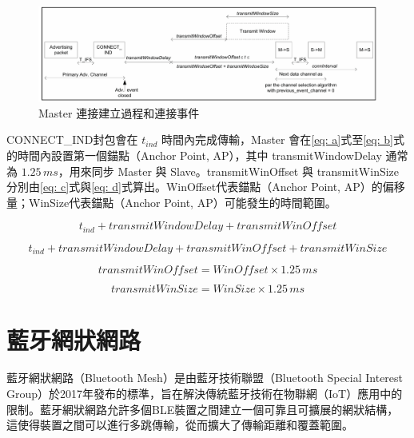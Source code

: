 \begin{ZhChapter}
\begin{figure}[H]
    \centering
    \includegraphics[width = 1\textwidth]{image/Master 連接建立過程和連接事件.png}
    \caption{Master 連接建立過程和連接事件\cite{bluetooth2016core}}
    \label{fig: Master 連接建立過程和連接事件}
\end{figure}

CONNECT\_IND封包會在 $t_{ind}$ 時間內完成傳輸，Master 會在\ref{eq: a}式至\ref{eq: b}式的時間內設置第一個錨點（Anchor Point, AP），其中 transmitWindowDelay 通常為 $1.25\,{ms}$，用來同步 Master 與 Slave。transmitWinOffset 與 transmitWinSize 分別由\ref{eq: c}式與\ref{eq: d}式算出。WinOffset代表錨點（Anchor Point, AP）的偏移量；WinSize代表錨點（Anchor Point, AP）可能發生的時間範圍\cite{10.1145/3412382.3458271}。

\begin{equation}
t_{ind} + transmitWindowDelay + transmitWinOffset
\label{eq: a}
\end{equation}

\begin{equation}
t_{ind} + transmitWindowDelay + transmitWinOffset + transmitWinSize
\label{eq: b}
\end{equation}

\begin{equation}
transmitWinOffset = WinOffset \times 1.25\, ms
\label{eq: c}
\end{equation}

\begin{equation}
transmitWinSize = WinSize \times 1.25\, ms 
\label{eq: d}
\end{equation}

\section{藍牙網狀網路}

藍牙網狀網路（Bluetooth Mesh）是由藍牙技術聯盟（Bluetooth Special Interest Group）於2017年發布的標準，旨在解決傳統藍牙技術在物聯網（IoT）應用中的限制。藍牙網狀網路允許多個BLE裝置之間建立一個可靠且可擴展的網狀結構，這使得裝置之間可以進行多跳傳輸，從而擴大了傳輸距離和覆蓋範圍。


\end{ZhChapter}
